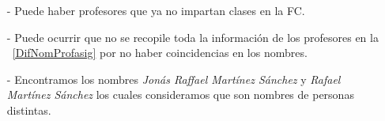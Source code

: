 \begin{itemize}
\item[-] Puede haber profesores que ya no impartan clases en la FC.

\item[-] Puede ocurrir que no se recopile toda la información de los profesores en la \tablename{~\ref{DifNomProfasig}} por no haber coincidencias en los nombres.

\item[-] Encontramos los nombres \textit{Jonás Raffael Martínez Sánchez} y \textit{Rafael Martínez Sánchez} los cuales consideramos que son nombres de personas distintas.

\end{itemize}
